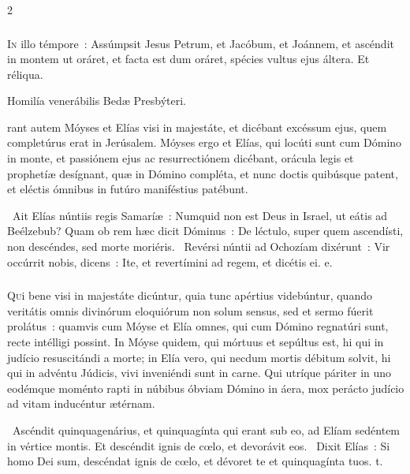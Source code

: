 \documentclass[9pt,twoside]{extarticle}
\begin{document}
\begin{multicols}{2}
{\subsubsection*{\center {}}
\lettrine{I}n illo témpore~: Assúmpsit Jesus Petrum, et Jacóbum, et Joánnem, et ascéndit in montem ut oráret, et facta est dum oráret, spécies vultus ejus áltera. Et réliqua. 

\begin{center}Homilía venerábilis Bedæ Presbýteri.\end{center}
rant autem Móyses et Elías visi in majestáte, et dicébant excéssum ejus, quem completúrus erat in Jerúsalem. Móyses ergo et Elías, qui locúti sunt cum Dómino in monte, et passiónem ejus ac resurrectiónem dicébant, orácula legis et prophetíæ desígnant, quæ in Dómino compléta, et nunc doctis quibúsque patent, et eléctis ómnibus in futúro maniféstius patébunt.

\begin{tightlist}{}
\item {}~Ait Elías núntiis regis Samaríæ~: Numquid non est Deus in Israel, ut eátis ad Beélzebub? Quam ob rem hæc dicit Dóminus~: \textred{*} De léctulo, super quem ascendísti, non descéndes, sed morte moriéris. ~Revérsi núntii ad Ochozíam dixérunt~: Vir occúrrit nobis, dicens~: Ite, et revertímini ad regem, et dicétis ei. e.
\end{tightlist}

\subsubsection*{\center {}}
\lettrine{Q}ui bene visi in majestáte dicúntur, quia tunc apértius videbúntur, quando veritátis omnis divinórum eloquiórum non solum sensus, sed et sermo fúerit prolátus~: quamvis cum Móyse et Elía omnes, qui cum Dómino regnatúri sunt, recte intélligi possint. In Móyse quidem, qui mórtuus et sepúltus est, hi qui in judício resuscitándi a morte; in Elía vero, qui necdum mortis débitum solvit, hi qui in advéntu Júdicis, vivi inveniéndi sunt in carne. Qui utríque páriter in uno eodémque moménto rapti in núbibus óbviam Dómino in áera, mox perácto judício ad vitam inducéntur ætérnam.

\begin{tightlist}{}
\item {}~Ascéndit quinquagenárius, et quinquagínta qui erant sub eo, ad Elíam sedéntem in vértice montis. \textred{*} Et descéndit ignis de cœlo, et devorávit eos. ~Dixit Elías~: Si homo Dei sum, descéndat ignis de cœlo, et dévoret te et quinquagínta tuos. t.
\end{tightlist}

}
\end{multicols}
\end{document}
